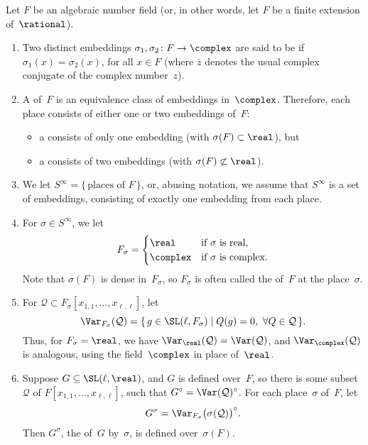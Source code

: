 \begin{defn} \label{PlaceDefn}
 Let $F$ be an algebraic number field (or, in other words, let $F$ be a finite extension of~$\rational$).
 \begin{enumerate}
 \item Two distinct embeddings $\sigma_1, \sigma_2 \colon F
\to \complex$ are said to be  if $\sigma_1(x) =
\overline{\sigma_2(x)}$, for all $x \in F$ (where
$\overline{z}$ denotes the usual complex conjugate of the
complex number~$z$).
 \item A  of~$F$ is an equivalence
class of embeddings in~$\complex$. Therefore, each place
consists of either one or two embeddings of~$F$: 
	\begin{itemize}
	\item a  consists of only one embedding (with
$\sigma(F) \subset \real$), but
	\item a  consists
of two embeddings (with $\sigma(F) \not\subset \real$).
	\end{itemize}
 \item We let $S^\infty = \{\, \mbox{places of~$F$} \,\}$,
or, abusing notation, we assume that $S^\infty$ is a set of
embeddings, consisting of exactly one embedding from each
place.
 \item For $\sigma \in S^\infty$, we let
 $$ F_\sigma = 
 \begin{cases}
 \real & \mbox{if $\sigma$ is real}, \\
 \complex & \mbox{if $\sigma$ is complex}.
 \end{cases}
 $$
 Note that $\sigma(F)$ is dense in~$F_\sigma$, so $F_\sigma$
is often called the 
of~$F$ at the place~$\sigma$.
 \item For $\mathcal{Q} \subset
F_\sigma[x_{1,1},\ldots,x_{\ell,\ell}]$, let
 $$ \Var_{F_\sigma}(\mathcal{Q})
 = \{\, g \in \SL(\ell,F_\sigma) \mid Q(g) = 0, \ \forall Q
\in \mathcal{Q} \,\} .$$
 Thus, for $F_\sigma = \real$, we have
$\Var_{\real}(\mathcal{Q}) = \Var(\mathcal{Q})$, and
$\Var_{\complex}(\mathcal{Q})$ is analogous, using the
field~$\complex$ in place of~$\real$.
 \item Suppose $G \subseteq \SL(\ell,\real)$, and $G$ is
defined over~$F$, so there is some subset~$\mathcal{Q}$ of
$F[x_{1,1},\ldots,x_{\ell,\ell}]$, such that $G^\circ =
\Var(\mathcal{Q})^\circ$. For each place~$\sigma$ of~$F$, let
 $$ G^\sigma = \Var_{F_\sigma}\bigl( \sigma(\mathcal{Q})
\bigr)^\circ .$$
 Then $G^\sigma$, the  of~$G$ by~$\sigma$, is defined over~$\sigma(F)$.
 \end{enumerate}
 \end{defn}

